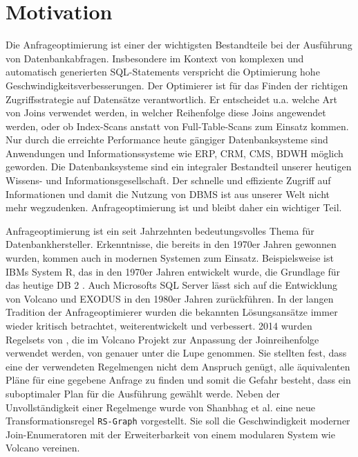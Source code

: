 \section{Motivation}


Die Anfrageoptimierung ist einer der wichtigsten Bestandteile bei der Ausführung von Datenbankabfragen. Insbesondere im Kontext von komplexen und automatisch generierten SQL-Statements verspricht die Optimierung hohe Geschwindigkeitsverbesserungen. Der Optimierer ist für das Finden der richtigen Zugriffsstrategie auf Datensätze verantwortlich. Er entscheidet u.a. welche Art von Joins verwendet werden, in welcher Reihenfolge diese Joins angewendet werden, oder ob Index-Scans anstatt von Full-Table-Scans zum Einsatz kommen. Nur durch die erreichte Performance heute gängiger Datenbanksysteme sind Anwendungen und Informationssysteme wie \ac{ERP}, \ac{CRM}, \ac{CMS}, \ac{BDWH} möglich geworden. Die Datenbanksysteme sind ein integraler Bestandteil unserer heutigen Wissens- und Informationsgesellschaft. Der schnelle und effiziente Zugriff auf Informationen und damit die Nutzung von \ac{DBMS} ist aus unserer Welt nicht mehr wegzudenken. Anfrageoptimierung ist und bleibt daher ein wichtiger Teil.

Anfrageoptimierung ist ein seit Jahrzehnten bedeutungsvolles Thema für Datenbankhersteller. Erkenntnisse, die bereits in den 1970er Jahren gewonnen wurden, kommen auch in modernen Systemen zum Einsatz. Beispielsweise ist IBMs System R, das in den 1970er Jahren entwickelt wurde, die Grundlage für das heutige DB 2  \cite{wade2012ibm}. Auch Microsofts SQL Server lässt sich auf die Entwicklung von Volcano und EXODUS in den 1980er Jahren zurückführen.
In der langen Tradition der Anfrageoptimierer wurden die bekannten Lösungsansätze immer wieder kritisch betrachtet, weiterentwickelt und verbessert. 2014 wurden Regelsets von \cite{pellenkoft1997complexity}, die im Volcano Projekt zur Anpassung der Joinreihenfolge verwendet werden, von \cite{shanbhag2014optimizing} genauer unter die Lupe genommen.
Sie stellten fest, dass eine der verwendeten Regelmengen nicht dem Anspruch genügt, alle äquivalenten Pläne für eine gegebene Anfrage zu finden und somit die Gefahr besteht, dass ein suboptimaler Plan für die Ausführung gewählt werde. Neben der Unvollständigkeit einer Regelmenge wurde von Shanbhag et al. eine neue Transformationsregel \texttt{RS-Graph} vorgestellt. Sie soll die Geschwindigkeit moderner Join-Enumeratoren mit der Erweiterbarkeit von einem modularen System wie Volcano vereinen.

